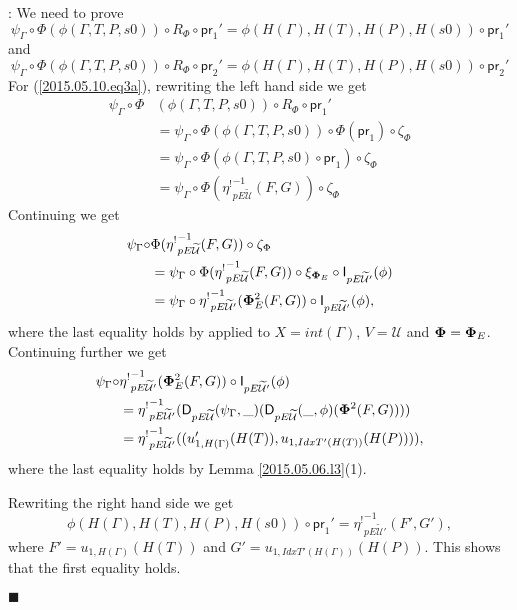 \documentclass[12pt]{article}
\numberwithin{equation}{section}
\newenvironment{eq}{\begin{equation}}{\end{equation}}
\newenvironment{myproof}{{\bf Proof}:}{$\blacksquare$ \vskip 5mm }
\newcommand{\wt}{\widetilde}
\newcommand{\U}{\mathcal{U}}
\newcommand{\D}{\mathsf{D}}
\newcommand{\I}{\mathsf{I}}
\newcommand{\etashriek}{\eta^!}
\newcommand{\etaunshriek}{{\etashriek}^{-1}}
\newcommand{\pr}{\mathsf{pr}}
\begin{document}
\begin{myproof}
We need to prove
%
\begin{eq}
\label{2015.05.10.eq3a} \psi_{\Gamma}\circ \Phi(\phi(\Gamma,T,P,s0))\circ
R_{\Phi}\circ \pr_1' = \phi(H(\Gamma),H(T),H(P),H(s0))\circ \pr_1'
\end{eq}%
%
and
%
%
\begin{eq}
\label{2015.05.10.eq3b} \psi_{\Gamma}\circ \Phi(\phi(\Gamma,T,P,s0))\circ
R_{\Phi}\circ \pr_2' = \phi(H(\Gamma),H(T),H(P),H(s0))\circ \pr_2'
\end{eq}%
%
For (\ref{2015.05.10.eq3a}), rewriting the left hand side we get
%
\begin{align*}
  \psi_{\Gamma}\circ \Phi&(\phi(\Gamma,T,P,s0))\circ R_{\Phi}\circ \pr_1'  \\
    & = \psi_{\Gamma}\circ \Phi(\phi(\Gamma,T,P,s0))\circ\Phi(\pr_1)\circ \zeta_{\Phi} \\
    & = \psi_{\Gamma}\circ \Phi(\phi(\Gamma,T,P,s0)\circ \pr_1)\circ \zeta_{\Phi} \\
    & = \psi_{\Gamma}\circ \Phi(\etaunshriek_{pE\wt{\U}}(F,G))\circ \zeta_{\Phi}
\end{align*}
%
Continuing we get
%
\begin{align*}
  \psi_{\Gamma}\circ & \Phi(\etaunshriek_{pE\wt{\U}}(F,G))\circ \zeta_{\Phi} \\
    & = \psi_{\Gamma}\circ \Phi(\etaunshriek_{pE\wt{\U}}(F,G))\circ \xi_{{\bf \Phi}_E}\circ \I_{pE\wt{\U}'}(\phi) \\
    & = \psi_{\Gamma}\circ\etaunshriek_{pE\wt{\U}'}({\bf\Phi}^2_E(F,G))\circ \I_{pE\wt{\U}'}(\phi),
\end{align*}
%
where the last equality holds by \cite[Lemma 5.8]{fromunivwithPi} applied to
$X=int(\Gamma)$, $V=\U$ and ${\bf\Phi}={\bf\Phi}_E$. Continuing further we get
%
\begin{align*}
  \psi_{\Gamma}\circ&\etaunshriek_{pE\wt{\U}'}({\bf\Phi}^2_E(F,G))\circ \I_{pE\wt{\U}'}(\phi) \\
    & = \etaunshriek_{pE\wt{\U}'}(\D_{pE\wt{\U}}(\psi_{\Gamma},\_)(\D_{pE\wt{\U}}(\_,\phi)({\bf\Phi}^2(F,G)))) \\
    & = \etaunshriek_{pE\wt{\U}'}((u_{1,H(\Gamma)}'(H(T)),u_{1,IdxT'(H(T))}(H(P)))),
\end{align*}
%
where the last equality holds by Lemma \ref{2015.05.06.l3}(1).

Rewriting the right hand side we get
%
$$\phi(H(\Gamma),H(T),H(P),H(s0))\circ \pr_1'=\etaunshriek_{pE\wt{\U}'}(F',G'),$$
%
where $F'=u_{1,H(\Gamma)}(H(T))$ and $G'=u_{1,IdxT'(H(\Gamma))}(H(P))$.  This
shows that the first equality holds.


\end{myproof}
\end{document}
